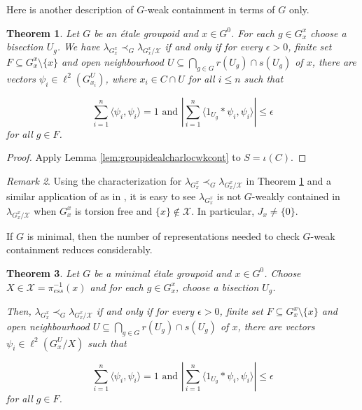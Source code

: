 \documentclass[a4paper, 12pt]{amsart}
\newtheorem{thm}{Theorem}[section]
\theoremstyle{definition}
\theoremstyle{remark}
\newtheorem{rmk}[thm]{Remark}
\numberwithin{equation}{section}
\begin{document}
Here is another description of $G$-weak containment in terms of $G$ only.

\begin{thm}
\label{thm:vsingidealcharlocwkcont_cont}
    Let $G$ be an \'etale groupoid and $x\in G^{0}$. For each $g\in G^{x}_{x}$ choose a bisection $U_{g}$. We have $\lambda_{G^{x}_{x}}\prec_{G}\lambda_{G^{x}_{x}/\mathcal{X}}$ if and only if for every $\epsilon > 0$, finite set $F\subseteq G^{x}_{x}\setminus \{x\}$ and open neighbourhood $U\subseteq \bigcap_{g\in G}r(U_{g})\cap s(U_{g})$ of $x$, there are vectors $\psi_{i}\in \ell^{2}(G^{U}_{x_{i}})$, where $x_{i}\in C\cap U$ for all $i\leq n$ such that 

    $$\sum^{n}_{i=1}\langle \psi_{i}, \psi_{i}\rangle = 1 \text{ and } |\sum^{n}_{i=1}\langle 1_{U_{g}}*\psi_{i}, \psi_{i}\rangle |\leq \epsilon$$ for all $g\in F$.
\end{thm}

\begin{proof}
    Apply Lemma \ref{lem:groupidealcharlocwkcont} to $S = \iota(C)$.
\end{proof}

\begin{rmk}
\label{rmk:torfree}
    Using the characterization for $\lambda_{G^{x}_{x}}\prec_{G}\lambda_{G^{x}_{x}/\mathcal{X}}$ in Theorem \ref{thm:vsingidealcharlocwkcont_cont} and a similar application of \cite[Lemma~1.9]{NS23} as in \cite[Proposition~1.8]{NS23}, it is easy to see $\lambda_{G^{x}_{x}}$ is not $G$-weakly contained in $\lambda_{G^{x}_{x}/\mathcal{X}}$ when $G^{x}_{x}$ is torsion free and $\{x\}\notin \mathcal{X}$. In particular, $J_{x}\neq \{0\}$.
\end{rmk}

If $G$ is minimal, then the number of representations needed to check $G$-weak containment reduces considerably. 

\begin{thm}
\label{thm:vsingidealcharlocwkcont_min}
    Let $G$ be a minimal \'etale groupoid and $x\in G^{0}$. Choose $X\in \mathcal{X} = \pi^{-1}_{ess}(x)$ and for each $g\in G^{x}_{x}$, choose a bisection $U_{g}$.
    
    Then, $\lambda_{G^{x}_{x}}\prec_{G}\lambda_{G^{x}_{x}/\mathcal{X}}$ if and only if for every $\epsilon > 0$, finite set $F\subseteq G^{x}_{x}\setminus \{x\}$ and open neighbourhood $U\subseteq \bigcap_{g\in G}r(U_{g})\cap s(U_{g})$ of $x$, there are vectors $\psi_{i}\in \ell^{2}(G^{U}_{x}/X)$ such that 

    $$\sum^{n}_{i=1}\langle \psi_{i}, \psi_{i}\rangle = 1 \text{ and } |\sum^{n}_{i=1}\langle 1_{U_{g}}*\psi_{i}, \psi_{i}\rangle |\leq \epsilon$$ for all $g\in F$.
\end{thm}
\end{document}
